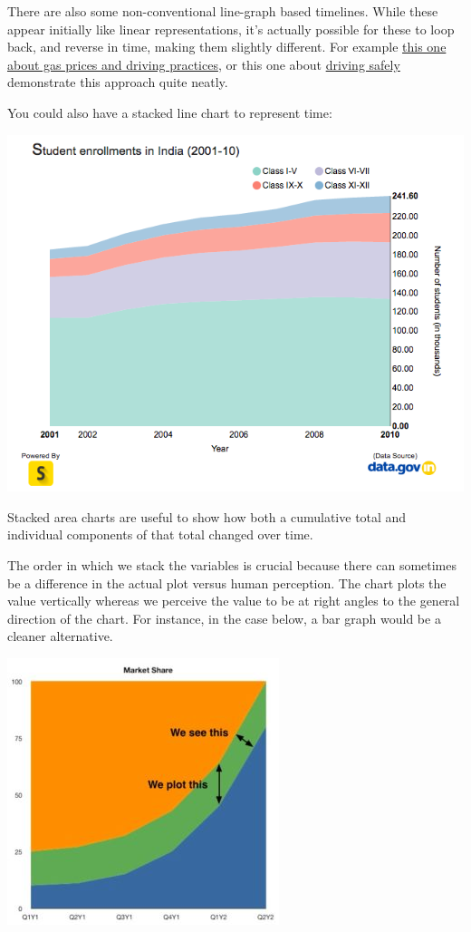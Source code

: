 \documentclass[]{book}
\theoremstyle{definition}
\theoremstyle{definition}
\theoremstyle{definition}
\theoremstyle{remark}
\begin{document}
There are also some non-conventional line-graph based timelines. While
these appear initially like linear representations, it's actually
possible for these to loop back, and reverse in time, making them
slightly different. For example
\href{http://www.nytimes.com/imagepages/2010/05/02/business/02metrics.html}{this
one about gas prices and driving practices}, or this one about
\href{http://www.nytimes.com/interactive/2012/09/17/science/driving-safety-in-fits-and-starts.html}{driving
safely} demonstrate this approach quite neatly.

You could also have a stacked line chart to represent time:

\includegraphics{imgs/other_time_graph_1.png}

Stacked area charts are useful to show how both a cumulative total and
individual components of that total changed over time.

The order in which we stack the variables is crucial because there can
sometimes be a difference in the actual plot versus human perception.
The chart plots the value vertically whereas we perceive the value to be
at right angles to the general direction of the chart. For instance, in
the case below, a bar graph would be a cleaner alternative.

\includegraphics{imgs/other_time_graph_2.jpg}
\end{document}
